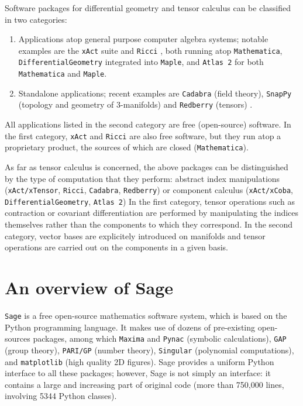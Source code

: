\documentclass[a4paper]{jpconf}
\newcommand{\soft}[1]{\texttt{#1}}
\begin{document}
Software packages for differential geometry and tensor calculus can be 
classified in two categories: 
\begin{enumerate}
\item Applications atop general purpose computer algebra systems; 
notable examples are 
the \soft{xAct} suite \cite{Marti08,xAct} and \soft{Ricci} \cite{Ricci}, both
running atop \soft{Mathematica},
\soft{DifferentialGeometry} \cite{AnderT12,DiffGeom} integrated into \soft{Maple}, and \soft{Atlas 2}
\cite{Atlas2} for both \soft{Mathematica} and \soft{Maple}.
\item Standalone applications; recent examples are \soft{Cadabra} \cite{Peete07,Cadabra} (field theory),
\soft{SnapPy} \cite{SnapPy} (topology and geometry of 3-manifolds) and
\soft{Redberry} (tensors) \cite{BolotP13,Redberry}.
\end{enumerate}
All applications listed in the second category are free (open-source) software. In
the first category, \soft{xAct} and \soft{Ricci} are also free software, but
they run atop a proprietary product, the sources of which are closed (\soft{Mathematica}). 

As far as tensor calculus is concerned, the above packages can be distinguished by 
the type of computation that they perform: abstract index manipulations 
(\soft{xAct/xTensor}, \soft{Ricci}, \soft{Cadabra}, \soft{Redberry})
or component calculus (\soft{xAct/xCoba}, \soft{DifferentialGeometry}, \soft{Atlas 2})
In the first category, tensor operations such as contraction or covariant differentiation 
are performed by manipulating the indices themselves rather than the components 
to which they correspond. In the second category, vector bases are explicitely 
introduced on manifolds and tensor operations are carried out on the components 
in a given basis.



\section{An overview of Sage}

\soft{Sage} \cite{sage} is a free open-source mathematics software system, which is
based on the Python programming language. It makes use of dozens of pre-existing open-sources packages, 
among which \soft{Maxima} and \soft{Pynac} (symbolic calculations),
\soft{GAP} (group theory), 
\soft{PARI/GP} (number theory), \soft{Singular} (polynomial computations), 
and \soft{matplotlib} (high quality 2D figures). 
Sage provides a uniform Python interface to all these packages; however, 
Sage is not simply an interface: it contains a large and increasing part of 
original code (more than 750,000 lines, involving 5344 Python classes). 
\end{document}
